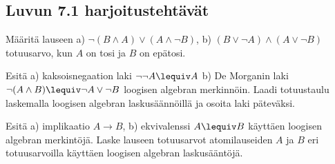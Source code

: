 
\subsection*{Luvun 7.1 harjoitustehtävät}

\setcounter{tehtava}{0}

\begin{tehtava}
	Määritä lauseen a) $\lnot(B\land A)\lor (A\land\lnot B)$, b) $(B\lor \lnot A)\land (A\lor \lnot B)$ totuusarvo, kun $A$ on tosi ja $B$ on epätosi.
	\begin{alakohdat}
	\end{alakohdat}
\end{tehtava}

\begin{tehtava}
	Esitä a) kaksoisnegaation laki $\lnot \lnot A \lequiv A$ b) De Morganin laki $\lnot(A\land B)\lequiv \lnot A\lor \lnot B$ loogisen algebran merkinnöin. Laadi totuustaulu laskemalla loogisen algebran laskusäännöillä ja osoita laki päteväksi.
	\begin{alakohdat}
		\alakohta{$-(-A)=A$}
		\alakohta{$-(A\cdot B)=(-A)+(-B)$}
	\end{alakohdat}
\end{tehtava}

\begin{tehtava}
	Esitä a) implikaatio $A\to B$, b) ekvivalenssi $A\lequiv B$ käyttäen loogisen algebran merkintöjä. Laske lauseen totuusarvot atomilauseiden $A$ ja $B$ eri totuusarvoilla käyttäen loogisen algebran laskusääntöjä.
	\begin{alakohdat}
		\alakohta{$(-A)+(A\cdot B)$}
		\alakohta{$((-A)\cdot (-B))+(A\cdot B)$}
	\end{alakohdat}
\end{tehtava}
